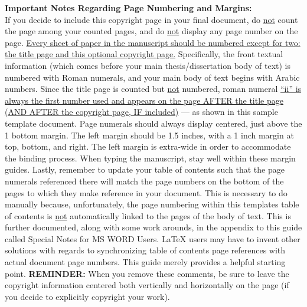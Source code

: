 \begin{thesiscopyrightpage}
\begin{singlespace}
{\small \textbf{Important Notes Regarding Page Numbering and Margins:}} \\
If you decide to include this copyright page in your final document, do
\uline{not} count the page among your counted pages, and do \uline{not} display
any page number on the page.  \uline{Every sheet of paper in the manuscript
should be numbered except for two:  the title page and this optional copyright
page.}  Specifically, the front textual information (which comes before your
main thesis/dissertation body of text) is numbered with Roman numerals, and
your main body of text begins with Arabic numbers.  Since the title page is
counted but \uline{not} numbered, roman numeral \uline{``ii'' is always the
first number used and appears on the page AFTER the title page (AND AFTER the
copyright page, IF included)} --- as shown in this sample template document.
Page numerals should always display centered, just above the 1 bottom margin.
The left margin should be 1.5 inches, with a 1 inch margin at top, bottom, and
right.  The left margin is extra-wide in order to accommodate the binding
process.  When typing the manuscript, stay well within these margin guides.
Lastly, remember to update your table of contents such that the page numerals
referenced there will match the page numbers on the bottom of the pages to
which they make reference in your document.  This is necessary to do manually
because, unfortunately, the page numbering within this templates table of
contents is \uline{not} automatically linked to the pages of the body of text.
This is further documented, along with some work arounds, in the appendix to
this guide called Special Notes for MS WORD Users.  \LaTeX{} users may have to
invent other solutions with regards to synchronizing table of contents page
references with actual document page numbers.  This guide merely provides a
helpful starting point.  \textbf{REMINDER:} When you remove these comments, be
sure to leave the copyright information centered both vertically and
horizontally on the page (if you decide to explicitly copyright your work).
\end{singlespace}
\fi
\end{thesiscopyrightpage}

